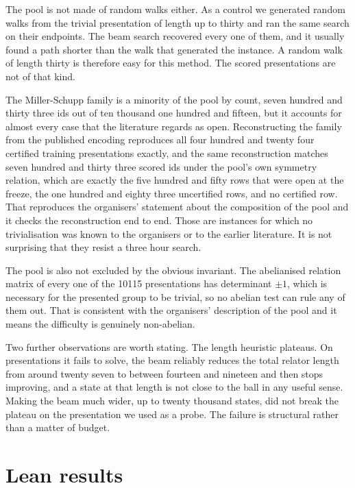 \documentclass[11pt]{article}
\newcommand{\poolSize}{10115}
\begin{document}
The pool is not made of random walks either. As a control we generated random walks from the trivial presentation of length up to thirty and ran the same search on their endpoints. The beam search recovered every one of them, and it usually found a path shorter than the walk that generated the instance. A random walk of length thirty is therefore easy for this method. The scored presentations are not of that kind.

The Miller-Schupp family is a minority of the pool by count, seven hundred and thirty three ids out of ten thousand one hundred and fifteen, but it accounts for almost every case that the literature regards as open. Reconstructing the family from the published encoding reproduces all four hundred and twenty four certified training presentations exactly, and the same reconstruction matches seven hundred and thirty three scored ids under the pool's own symmetry relation, which are exactly the five hundred and fifty rows that were open at the freeze, the one hundred and eighty three uncertified rows, and no certified row. That reproduces the organisers' statement about the composition of the pool and it checks the reconstruction end to end. Those are instances for which no trivialisation was known to the organisers or to the earlier literature. It is not surprising that they resist a three hour search.

The pool is also not excluded by the obvious invariant. The abelianised relation matrix of every one of the \poolSize{} presentations has determinant $\pm 1$, which is necessary for the presented group to be trivial, so no abelian test can rule any of them out. That is consistent with the organisers' description of the pool and it means the difficulty is genuinely non-abelian.

Two further observations are worth stating. The length heuristic plateaus. On presentations it fails to solve, the beam reliably reduces the total relator length from around twenty seven to between fourteen and nineteen and then stops improving, and a state at that length is not close to the ball in any useful sense. Making the beam much wider, up to twenty thousand states, did not break the plateau on the presentation we used as a probe. The failure is structural rather than a matter of budget.

\section{Lean results}
\end{document}
